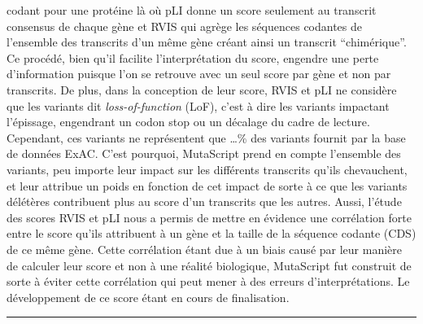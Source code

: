 \documentclass[12pt,twoside]{reedthesis}
\theoremstyle{definition}
\theoremstyle{definition}
\theoremstyle{remark}
\begin{document}
  codant pour une protéine là où pLI donne un score seulement au transcrit
  consensus de chaque gène et RVIS qui agrège les séquences codantes de
  l'ensemble des transcrits d'un même gène créant ainsi un transcrit
  ``chimérique''. Ce procédé, bien qu'il facilite l'interprétation du
  score, engendre une perte d'information puisque l'on se retrouve avec un
  seul score par gène et non par transcrits. De plus, dans la conception
  de leur score, RVIS et pLI ne considère que les variants dit
  \emph{loss-of-function} (LoF), c'est à dire les variants impactant
  l'épissage, engendrant un codon stop ou un décalage du cadre de lecture.
  Cependant, ces variants ne représentent que \ldots{}\% des variants
  fournit par la base de données ExAC. C'est pourquoi, MutaScript prend en
  compte l'ensemble des variants, peu importe leur impact sur les
  différents transcrits qu'ils chevauchent, et leur attribue un poids en
  fonction de cet impact de sorte à ce que les variants délétères
  contribuent plus au score d'un transcrits que les autres. Aussi, l'étude
  des scores RVIS et pLI nous a permis de mettre en évidence une
  corrélation forte entre le score qu'ils attribuent à un gène et la
  taille de la séquence codante (CDS) de ce même gène. Cette corrélation
  étant due à un biais causé par leur manière de calculer leur score et
  non à une réalité biologique, MutaScript fut construit de sorte à éviter
  cette corrélation qui peut mener à des erreurs d'interprétations. Le
  développement de ce score étant en cours de finalisation.
  
  \begin{center}\rule{0.5\linewidth}{\linethickness}\end{center}
  
\end{document}
